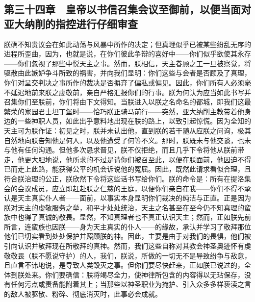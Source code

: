 
\subsection{第三十四章　皇帝以书信召集会议至御前，以便当面对亚大纳削的指控进行仔细审查}

\par

朕确不知贵议会在如此动荡与风暴中所作的决定；但真理似乎已被某些纷乱无序的进程所歪曲，因为，也就是说，在你们彼此争辩的喜好中——你们似乎欲使其永存——你们忽视了那些中悦天主之事。然而，朕相信，天主眷顾之工一旦被察觉，将驱散由此嫉妒争斗所致的祸害，并向我们显明：你们这些与会者是否顾及了真理，你们对呈交判决之事所作的裁决是否摒弃了偏私或偏见。因此，你们所有人必须毫不延迟地前来朕之虔敬前，亲自严格汇报你们的行事。朕为何认为应当如此书写并召集你们至朕前，你们将由下文得知。当朕进入以朕之名命名的都城，即我们这最繁荣的家园君士坦丁堡时——恰巧朕正骑马前行——突然，亚大纳削主教带着他身边的一些神职人员，如此出乎意料地出现在朕的路上，以致引起惊慌。因为全知的天主可为朕作证：初见之时，朕并未认出他，直到朕的若干随从应朕之问询，极其自然地向朕告知他是何人，以及他遭受了何等不义。那时，朕既未与他交谈，也未与他有任何沟通。但他多次恳求晋见，朕不仅拒绝，而且几乎下令将他从朕前带走，他更大胆地说，他所求的不过是请你们被召至此，以便在朕面前，他因迫不得已而走上此路，能获得公平的机会诉说他的冤屈。因此，既然此请求看似合理，且符合朕治理的公正，朕欣然下令将这些话书写给你们。朕的命令是：所有在提洛集会的会议成员，应立即赶赴朕之仁慈的王庭，以便你们亲自在我——你们不得不承认是天主真实仆人者——面前，以事实本身显明你们裁决的纯洁与正直。正是因为朕对天主的虔敬服务之举，和平才处处统治，天主之名甚至在至今仍不知真理的蛮族中也得了真诚的敬畏。显然，不知真理者也不真正认识天主；然而，正如朕先前所言，连蛮族也因朕——身为天主真实的仆人——的缘故，承认并学习了敬拜那位他们已切实看到处处保护并照顾朕的神。因此，主要是由于对我们的畏惧，他们被引向认识并敬拜现在所敬拜的真神。然而，我们这些自称对其教会神圣奥迹怀有虔敬敬畏（朕不愿说守护）的人，我们，朕说，所做的一切无不是导致纷争与敌意，且直言不讳地说，是导致人类毁灭之事。但你们要尽快赶来，正如朕已说过的，全体到朕处来。你们要确信：朕将竭尽全力，使神律所包含的内容得以无玷保存，没有任何污点或责备能附着其上；当那些以神圣职业为掩护、引入众多多样亵渎之言的敌人被驱散、粉碎、彻底消灭时，此事必会成就。\par


